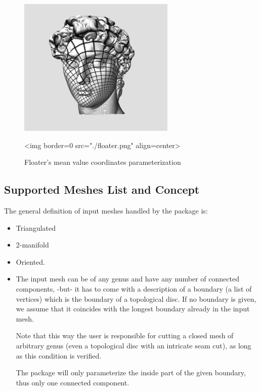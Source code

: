 \begin{figure}[bht]
    \begin{center}
        \begin{ccTexOnly}
            \includegraphics{Parameterization/floater} %
        \end{ccTexOnly}
        \begin{ccHtmlOnly}
            <img border=0 src="./floater.png" align=center>
        \end{ccHtmlOnly}
        \label{parameterization-fig-floater}

        \caption{Floater's mean value coordinates parameterization}
    \end{center}
\end{figure}


\subsection{Supported Meshes List and Concept}

The general definition of input meshes handled by the package is:

\begin{itemize}

\item Triangulated

\item 2-manifold

\item Oriented.

\item The input mesh can be of any genus and have any number of connected components,
-but- it has to come with a description of a boundary (a list of
vertices) which is the boundary of
a topological disc. If no boundary is given, we assume that it
coincides with the longest boundary already in the input mesh.

Note that this way the user is responsible for cutting a closed mesh of
arbitrary genus (even a topological disc with an intricate seam
cut), as long as this condition is verified.

The package will only parameterize the inside part of the given boundary,
thus only one connected component.

\end{itemize}

